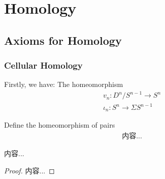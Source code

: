 \documentclass[Total.tex]{subfiles}
\begin{document}
	
	\chapter{Homology}
		
		
		\section{Axioms for Homology}
		\subsection{Cellular Homology}
		
		Firstly, we have: The homeomorphism
		\begin{gather*}
			v_n:D^n/S^{n-1}\rightarrow S^n\\
			\iota_n:S^n\rightarrow \Sigma S^{n-1}
		\end{gather*}
		
		Define the homeomorphism of pairs
		\begin{gather*}
			内容...
		\end{gather*}
		
		\begin{lemma}
			内容...
		\end{lemma}
		\begin{proof}
			内容...
		\end{proof}
\end{document}
